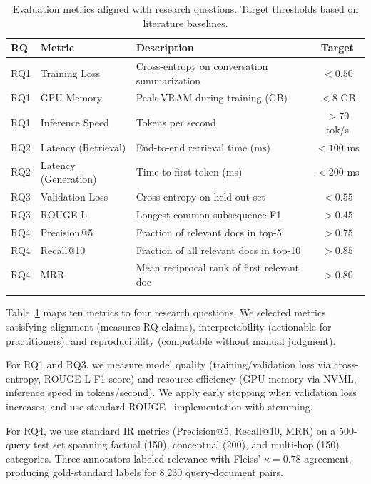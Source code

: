\documentclass[pdflatex,sn-basic]{sn-jnl}
\begin{document}
\begin{table}[tb]
    \caption{Evaluation metrics aligned with research questions. Target thresholds based on literature baselines.}
    \label{tab:evaluation-metrics}
    \centering
    \small
    \begin{tabular}{llp{5cm}c}
        \toprule
        \textbf{RQ} & \textbf{Metric} & \textbf{Description} & \textbf{Target} \\
        \midrule
        RQ1 & Training Loss & Cross-entropy on conversation summarization & $< 0.50$ \\
        RQ1 & GPU Memory & Peak VRAM during training (GB) & $< 8$ GB \\
        RQ1 & Inference Speed & Tokens per second & $> 70$ tok/s \\
        \midrule
        RQ2 & Latency (Retrieval) & End-to-end retrieval time (ms) & $< 100$ ms \\
        RQ2 & Latency (Generation) & Time to first token (ms) & $< 200$ ms \\
        \midrule
        RQ3 & Validation Loss & Cross-entropy on held-out set & $< 0.55$ \\
        RQ3 & ROUGE-L & Longest common subsequence F1 & $> 0.45$ \\
        \midrule
        RQ4 & Precision@5 & Fraction of relevant docs in top-5 & $> 0.75$ \\
        RQ4 & Recall@10 & Fraction of all relevant docs in top-10 & $> 0.85$ \\
        RQ4 & MRR & Mean reciprocal rank of first relevant doc & $> 0.80$ \\
        \botrule
    \end{tabular}
\end{table}

Table~\ref{tab:evaluation-metrics} maps ten metrics to four research questions. We selected metrics satisfying alignment (measures RQ claims), interpretability (actionable for practitioners), and reproducibility (computable without manual judgment).

For RQ1 and RQ3, we measure model quality (training/validation loss via cross-entropy, ROUGE-L F1-score) and resource efficiency (GPU memory via NVML, inference speed in tokens/second). We apply early stopping when validation loss increases, and use standard ROUGE~\citep{lin2004rouge} implementation with stemming.

For RQ4, we use standard IR metrics (Precision@5, Recall@10, MRR) on a 500-query test set spanning factual (150), conceptual (200), and multi-hop (150) categories. Three annotators labeled relevance with Fleiss' $\kappa=0.78$ agreement, producing gold-standard labels for 8,230 query-document pairs.
\end{document}

